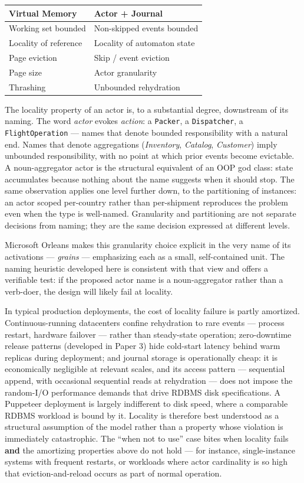 \documentclass[
]{article}
\newcounter{none} %
\let\origtexttt\texttt%
\renewcommand{\texttt}[1]{\origtexttt{\seqsplit{#1}}}%
\let\texttt\origtexttt%
\begin{document}
{\def\LTcaptype{none} %
\begin{longtable}[]{@{}ll@{}}
\toprule\noalign{}
Virtual Memory & Actor + Journal \\
\midrule\noalign{}
\endhead
\bottomrule\noalign{}
\endlastfoot
Working set bounded & Non-skipped events bounded \\
Locality of reference & Locality of automaton state \\
Page eviction & Skip / event eviction \\
Page size & Actor granularity \\
Thrashing & Unbounded rehydration \\
\end{longtable}
}

The locality property of an actor is, to a substantial degree,
downstream of its naming. The word \emph{actor} evokes \emph{action}: a
\texttt{Packer}, a \texttt{Dispatcher}, a \texttt{FlightOperation} ---
names that denote bounded responsibility with a natural end. Names that
denote aggregations (\emph{Inventory}, \emph{Catalog}, \emph{Customer})
imply unbounded responsibility, with no point at which prior events
become evictable. A noun-aggregator actor is the structural equivalent
of an OOP god class: state accumulates because nothing about the name
suggests when it should stop. The same observation applies one level
further down, to the partitioning of instances: an actor scoped
per-country rather than per-shipment reproduces the problem even when
the type is well-named. Granularity and partitioning are not separate
decisions from naming; they are the same decision expressed at different
levels.

Microsoft Orleans makes this granularity choice explicit in the very
name of its activations --- \emph{grains} --- emphasizing each as a
small, self-contained unit. The naming heuristic developed here is
consistent with that view and offers a verifiable test: if the proposed
actor name is a noun-aggregator rather than a verb-doer, the design will
likely fail at locality.

In typical production deployments, the cost of locality failure is
partly amortized. Continuous-running datacenters confine rehydration to
rare events --- process restart, hardware failover --- rather than
steady-state operation; zero-downtime release patterns (developed in
Paper 3) hide cold-start latency behind warm replicas during deployment;
and journal storage is operationally cheap: it is economically
negligible at relevant scales, and its access pattern --- sequential
append, with occasional sequential reads at rehydration --- does not
impose the random-I/O performance demands that drive RDBMS disk
specifications. A Puppeteer deployment is largely indifferent to disk
speed, where a comparable RDBMS workload is bound by it. Locality is
therefore best understood as a structural assumption of the model rather
than a property whose violation is immediately catastrophic. The ``when
not to use'' case bites when locality fails \textbf{and} the amortizing
properties above do not hold --- for instance, single-instance systems
with frequent restarts, or workloads where actor cardinality is so high
that eviction-and-reload occurs as part of normal operation.
\end{document}
